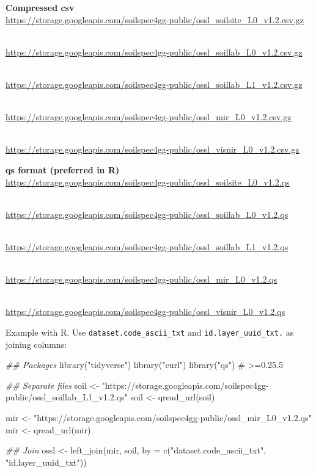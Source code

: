 \documentclass[
  letterpaper,
  DIV=11,
  numbers=noendperiod]{scrreprt}
\newenvironment{Shaded}{\begin{snugshade}}{\end{snugshade}}
\newcommand{\AttributeTok}[1]{\textcolor[rgb]{0.40,0.45,0.13}{#1}}
\newcommand{\CommentTok}[1]{\textcolor[rgb]{0.37,0.37,0.37}{#1}}
\newcommand{\DocumentationTok}[1]{\textcolor[rgb]{0.37,0.37,0.37}{\textit{#1}}}
\newcommand{\FunctionTok}[1]{\textcolor[rgb]{0.28,0.35,0.67}{#1}}
\newcommand{\NormalTok}[1]{\textcolor[rgb]{0.00,0.23,0.31}{#1}}
\newcommand{\OtherTok}[1]{\textcolor[rgb]{0.00,0.23,0.31}{#1}}
\newcommand{\StringTok}[1]{\textcolor[rgb]{0.13,0.47,0.30}{#1}}
\begin{document}
\textbf{Compressed csv}\\
\url{https://storage.googleapis.com/soilspec4gg-public/ossl_soilsite_L0_v1.2.csv.gz}\strut \\
\url{https://storage.googleapis.com/soilspec4gg-public/ossl_soillab_L0_v1.2.csv.gz}\strut \\
\url{https://storage.googleapis.com/soilspec4gg-public/ossl_soillab_L1_v1.2.csv.gz}\strut \\
\url{https://storage.googleapis.com/soilspec4gg-public/ossl_mir_L0_v1.2.csv.gz}\strut \\
\url{https://storage.googleapis.com/soilspec4gg-public/ossl_visnir_L0_v1.2.csv.gz}

\textbf{qs format (preferred in R)}\\
\url{https://storage.googleapis.com/soilspec4gg-public/ossl_soilsite_L0_v1.2.qs}\strut \\
\url{https://storage.googleapis.com/soilspec4gg-public/ossl_soillab_L0_v1.2.qs}\strut \\
\url{https://storage.googleapis.com/soilspec4gg-public/ossl_soillab_L1_v1.2.qs}\strut \\
\url{https://storage.googleapis.com/soilspec4gg-public/ossl_mir_L0_v1.2.qs}\strut \\
\url{https://storage.googleapis.com/soilspec4gg-public/ossl_visnir_L0_v1.2.qs}

Example with R. Use \texttt{dataset.code\_ascii\_txt} and
\texttt{id.layer\_uuid\_txt.} as joining columns:

\begin{Shaded}
\begin{Highlighting}[]
\DocumentationTok{\#\# Packages}
\FunctionTok{library}\NormalTok{(}\StringTok{"tidyverse"}\NormalTok{)}
\FunctionTok{library}\NormalTok{(}\StringTok{"curl"}\NormalTok{)}
\FunctionTok{library}\NormalTok{(}\StringTok{"qs"}\NormalTok{) }\CommentTok{\# \textgreater{}=0.25.5}

\DocumentationTok{\#\# Separate files}
\NormalTok{soil }\OtherTok{\textless{}{-}}  \StringTok{"https://storage.googleapis.com/soilspec4gg{-}public/ossl\_soillab\_L1\_v1.2.qs"}
\NormalTok{soil }\OtherTok{\textless{}{-}} \FunctionTok{qread\_url}\NormalTok{(soil)}

\NormalTok{mir }\OtherTok{\textless{}{-}} \StringTok{"https://storage.googleapis.com/soilspec4gg{-}public/ossl\_mir\_L0\_v1.2.qs"}
\NormalTok{mir }\OtherTok{\textless{}{-}} \FunctionTok{qread\_url}\NormalTok{(mir)}

\DocumentationTok{\#\# Join}
\NormalTok{ossl }\OtherTok{\textless{}{-}} \FunctionTok{left\_join}\NormalTok{(mir, soil, }\AttributeTok{by =} \FunctionTok{c}\NormalTok{(}\StringTok{"dataset.code\_ascii\_txt"}\NormalTok{, }\StringTok{"id.layer\_uuid\_txt"}\NormalTok{))}
\end{Highlighting}
\end{Shaded}
\end{document}
